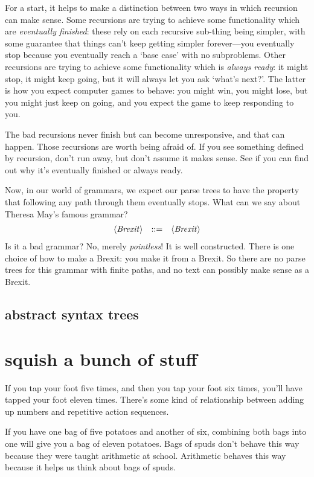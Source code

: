 \documentclass{book}
\begin{document}
For a start, it helps to make a distinction between two ways in which recursion can make sense. Some recursions are trying to achieve some functionality which are \emph{eventually finished}: these rely on each recursive sub-thing being simpler, with some guarantee that things can't keep getting simpler forever---you eventually stop because you eventually reach a `base case' with no subproblems. Other recursions are trying to achieve some functionality which is \emph{always ready}: it might stop, it might keep going, but it will always let you ask `what's next?'. The latter is how you expect computer games to behave: you might win, you might lose, but you might just keep on going, and you expect the game to keep responding to you.

The bad recursions never finish but can become unresponsive, and that can happen. Those recursions are worth being afraid of. If you see something defined by recursion, don't run away, but don't assume it makes sense. See if you can find out why it's eventually finished or always ready.

Now, in our world of grammars, we expect our parse trees to have the property that following any path through them eventually stops. What can we say about Theresa May's famous grammar?
\[\begin{array}{rrl}
\langle\mathit{Brexit}\rangle & ::= & \langle\mathit{Brexit}\rangle
\end{array}\]
Is it a bad grammar? No, merely \emph{pointless}! It is well constructed. There is one choice of how to make a Brexit: you make it from a Brexit. So there are no parse trees for this grammar with finite paths, and no text can possibly make sense as a Brexit.


\section{abstract syntax trees}


\chapter{squish a bunch of stuff}

If you tap your foot five times, and then you tap your foot six times, you'll have tapped your foot eleven times. There's some kind of relationship between adding up numbers and repetitive action sequences.

If you have one bag of five potatoes and another of six, combining both bags into one will give you a bag of eleven potatoes. Bags of spuds don't behave this way because they were taught arithmetic at school. Arithmetic behaves this way because it helps us think about bags of spuds.
\end{document}
